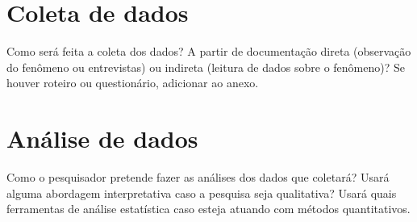 \section{Coleta de dados}
Como será feita a coleta dos dados? A partir de documentação direta (observação do fenômeno ou entrevistas) ou indireta (leitura de dados sobre o fenômeno)? Se houver roteiro ou questionário, adicionar ao anexo.

\section{Análise de dados}
Como o pesquisador pretende fazer as análises dos dados que coletará? Usará alguma abordagem interpretativa caso a pesquisa seja qualitativa? Usará quais ferramentas de análise estatística caso esteja atuando com métodos quantitativos.